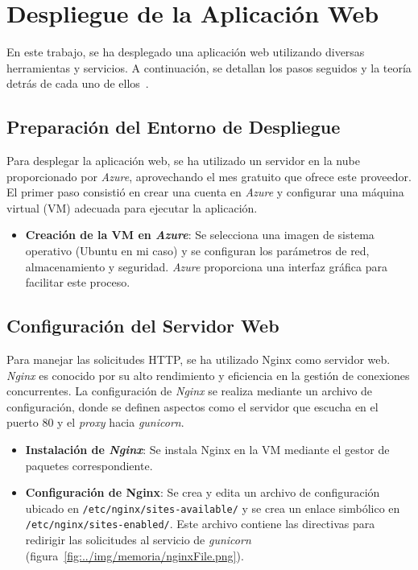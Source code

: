 \section{Despliegue de la Aplicación Web}
En este trabajo, se ha desplegado una aplicación web utilizando diversas herramientas y servicios. A continuación, se detallan los pasos seguidos y la teoría detrás de cada uno de ellos~\cite{deployApp}.

\subsection{Preparación del Entorno de Despliegue}

Para desplegar la aplicación web, se ha utilizado un servidor en la nube proporcionado por \textit{Azure}, aprovechando el mes gratuito que ofrece este proveedor. El primer paso consistió en crear una cuenta en \textit{Azure} y configurar una máquina virtual (VM) adecuada para ejecutar la aplicación.

\begin{itemize}
	\item \textbf{Creación de la VM en \textit{Azure}}: Se selecciona una imagen de sistema operativo (Ubuntu en mi caso) y se configuran los parámetros de red, almacenamiento y seguridad. \textit{Azure} proporciona una interfaz gráfica para facilitar este proceso.
\end{itemize}

\subsection{Configuración del Servidor Web}

Para manejar las solicitudes HTTP, se ha utilizado Nginx como servidor web. \textit{Nginx} es conocido por su alto rendimiento y eficiencia en la gestión de conexiones concurrentes. La configuración de \textit{Nginx} se realiza mediante un archivo de configuración, donde se definen aspectos como el servidor que escucha en el puerto 80 y el \textit{proxy} hacia \textit{gunicorn}.

\begin{itemize}
	\item \textbf{Instalación de \textit{Nginx}}: Se instala Nginx en la VM mediante el gestor de paquetes correspondiente.
	\item \textbf{Configuración de Nginx}: Se crea y edita un archivo de configuración ubicado en \texttt{/etc/nginx/sites-available/} y se crea un enlace simbólico en \texttt{/etc/nginx/sites-enabled/}. Este archivo contiene las directivas para redirigir las solicitudes al servicio de \textit{gunicorn} (figura~\ref{fig:../img/memoria/nginxFile.png}).
\end{itemize}

